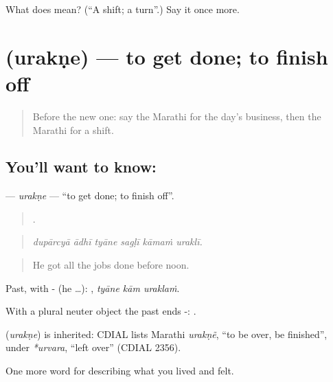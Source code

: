 \begin{tcolorbox}[breakable,colback=teal!4,colframe=teal!35!black,title={Before you move on}]
What does  mean? (\textquotedblleft{}A shift; a turn\textquotedblright{}.) Say it once more.
\end{tcolorbox}
\section[\texorpdfstring{\mr{उरकणे} (urakṇe)}{उरकणे (urakṇe)}]{ (urakṇe) — to get done; to finish off}

\label{lesson:MR-C514-urakne}



\begin{quote}
Before the new one: say the Marathi for the day's business, then the Marathi for a shift.
\end{quote}

\subsection*{You'll want to know: }
\textbf{} — \emph{urakṇe} — \textquotedblleft{}to get done; to finish off\textquotedblright{}.

\begin{quote}
     .
\end{quote}

\begin{quote}
\emph{dupārcyā ādhī tyāne sagḷī kāmaṁ uraklī.}
\end{quote}

\begin{quote}
He got all the jobs done before noon.
\end{quote}

Past, with - (he …):   , \emph{tyāne kām uraklaṁ}.

With a plural neuter object the past ends -:  .

\begin{cousinweb}
\textbf{} (\emph{urakṇe}) is inherited: CDIAL lists Marathi \emph{urakṇẽ}, \textquotedblleft{}to be over, be finished\textquotedblright{}, under \emph{*urvara}, \textquotedblleft{}left over\textquotedblright{} (CDIAL 2356).
\end{cousinweb}

\begin{grammarlens}[title={What you've built}]
One more word for describing what you lived and felt.
\end{grammarlens}

